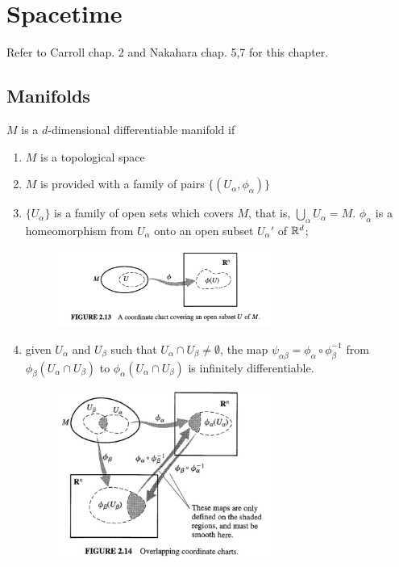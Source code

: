 \documentclass[../main/main.tex]{subfiles}
\begin{document}
\chapter{Spacetime}
Refer to \textsf{Carroll chap. 2} and \textsf{Nakahara chap. 5,7} for this chapter.\\

\section{Manifolds}

\begin{definition}[Manifold]{}
$M$ is a $d$-dimensional differentiable manifold if
\begin{enumerate}
\item $M$ is a topological space
\item $M$ is provided with a family of pairs $\{(U_\alpha, \phi_\alpha)\}$
\item $\{U_\alpha\}$ is a family of open sets which covers $M$, that is,  $\bigcup_\alpha U_\alpha=M$. $\phi_\alpha$ is a homeomorphism from $U_\alpha$ onto an open subset $U_\alpha'$ of $\mathbb{R}^d$;  
\begin{figure}[H]
\centering
\includegraphics[width=7cm]{../img/chart-diff-geo.jpg}
\end{figure}
\item given $U_\alpha$ and $U_\beta$ such that $U_\alpha\cap U_\beta\neq\emptyset$, the map $\psi_{\alpha\beta}=\phi_\alpha\circ\phi_\beta^{-1}$ from $\phi_\beta(U_\alpha\cap U_\beta)$ to $\phi_\alpha(U_\alpha\cap U_\beta)$ is infinitely differentiable.
\begin{figure}[H]
\centering
\includegraphics[width=7cm]{../img/compatible-chart-diff-geo.jpg}

\end{figure}
\end{enumerate}
\end{definition}
\end{document}
